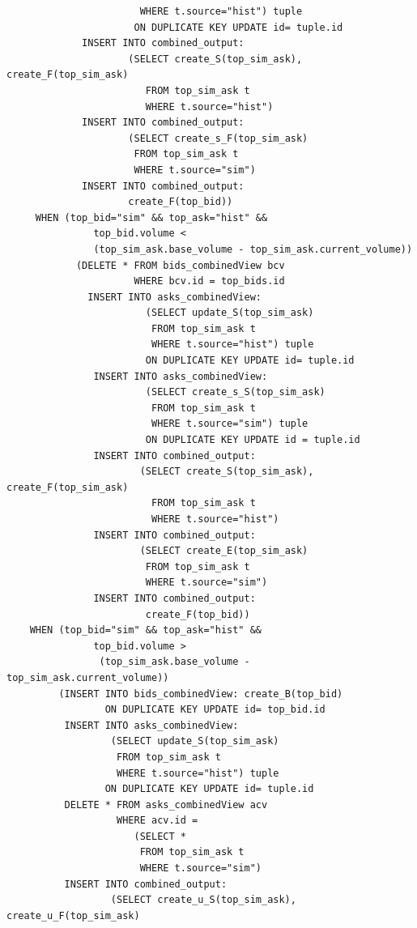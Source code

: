 \documentclass{article}
\begin{document}
\begin{verbatim}
                       WHERE t.source="hist") tuple
                      ON DUPLICATE KEY UPDATE id= tuple.id
             INSERT INTO combined_output:
                     (SELECT create_S(top_sim_ask), create_F(top_sim_ask)
                        FROM top_sim_ask t
                        WHERE t.source="hist")
             INSERT INTO combined_output:
                     (SELECT create_s_F(top_sim_ask)
                      FROM top_sim_ask t
                      WHERE t.source="sim")
             INSERT INTO combined_output:
                     create_F(top_bid))
     WHEN (top_bid="sim" && top_ask="hist" &&
               top_bid.volume < 
               (top_sim_ask.base_volume - top_sim_ask.current_volume)) 
            (DELETE * FROM bids_combinedView bcv
                      WHERE bcv.id = top_bids.id 
              INSERT INTO asks_combinedView: 
                        (SELECT update_S(top_sim_ask)
                         FROM top_sim_ask t
                         WHERE t.source="hist") tuple
                        ON DUPLICATE KEY UPDATE id= tuple.id
               INSERT INTO asks_combinedView:
                        (SELECT create_s_S(top_sim_ask)
                         FROM top_sim_ask t
                         WHERE t.source="sim") tuple
                        ON DUPLICATE KEY UPDATE id = tuple.id
               INSERT INTO combined_output:
                       (SELECT create_S(top_sim_ask), create_F(top_sim_ask)
                         FROM top_sim_ask t
                         WHERE t.source="hist")
               INSERT INTO combined_output:
                       (SELECT create_E(top_sim_ask)
                        FROM top_sim_ask t
                        WHERE t.source="sim")
               INSERT INTO combined_output:
                        create_F(top_bid))
    WHEN (top_bid="sim" && top_ask="hist" &&
               top_bid.volume > 
                (top_sim_ask.base_volume - top_sim_ask.current_volume))
         (INSERT INTO bids_combinedView: create_B(top_bid)
                 ON DUPLICATE KEY UPDATE id= top_bid.id
          INSERT INTO asks_combinedView: 
                  (SELECT update_S(top_sim_ask)
                   FROM top_sim_ask t
                   WHERE t.source="hist") tuple
                 ON DUPLICATE KEY UPDATE id= tuple.id
          DELETE * FROM asks_combinedView acv
                   WHERE acv.id = 
                      (SELECT *
                       FROM top_sim_ask t
                       WHERE t.source="sim")
          INSERT INTO combined_output:
                  (SELECT create_u_S(top_sim_ask), create_u_F(top_sim_ask)

\end{verbatim}
\end{document}
